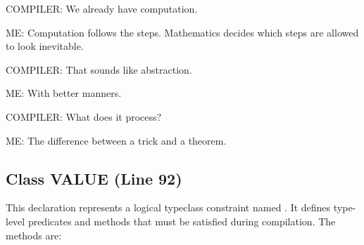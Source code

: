 \documentclass[11pt,oneside]{book}
\newcommand{\lean}[1]{\texttt{\detokenize{#1}}}
\begin{document}
COMPILER: We already have computation.



ME: Computation follows the steps. Mathematics decides which steps are allowed to look inevitable.



COMPILER: That sounds like abstraction.



ME: With better manners.



COMPILER: What does it process?



ME: The difference between a trick and a theorem.

\subsection{Class VALUE (Line 92)}
This declaration represents a logical typeclass constraint named \lean{VALUE}. It defines type-level predicates and methods that must be satisfied during compilation. The methods are:
\end{document}
